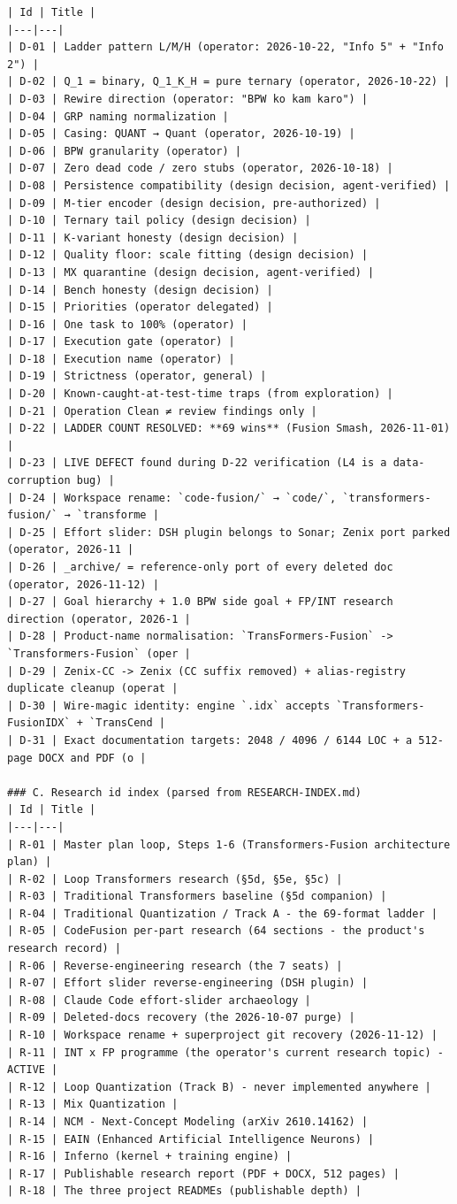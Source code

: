 \begin{Verbatim}[breaklines,breakanywhere,fontsize=\footnotesize]
| Id | Title |
|---|---|
| D-01 | Ladder pattern L/M/H (operator: 2026-10-22, "Info 5" + "Info 2") |
| D-02 | Q_1 = binary, Q_1_K_H = pure ternary (operator, 2026-10-22) |
| D-03 | Rewire direction (operator: "BPW ko kam karo") |
| D-04 | GRP naming normalization |
| D-05 | Casing: QUANT → Quant (operator, 2026-10-19) |
| D-06 | BPW granularity (operator) |
| D-07 | Zero dead code / zero stubs (operator, 2026-10-18) |
| D-08 | Persistence compatibility (design decision, agent-verified) |
| D-09 | M-tier encoder (design decision, pre-authorized) |
| D-10 | Ternary tail policy (design decision) |
| D-11 | K-variant honesty (design decision) |
| D-12 | Quality floor: scale fitting (design decision) |
| D-13 | MX quarantine (design decision, agent-verified) |
| D-14 | Bench honesty (design decision) |
| D-15 | Priorities (operator delegated) |
| D-16 | One task to 100% (operator) |
| D-17 | Execution gate (operator) |
| D-18 | Execution name (operator) |
| D-19 | Strictness (operator, general) |
| D-20 | Known-caught-at-test-time traps (from exploration) |
| D-21 | Operation Clean ≠ review findings only |
| D-22 | LADDER COUNT RESOLVED: **69 wins** (Fusion Smash, 2026-11-01) |
| D-23 | LIVE DEFECT found during D-22 verification (L4 is a data-corruption bug) |
| D-24 | Workspace rename: `code-fusion/` → `code/`, `transformers-fusion/` → `transforme |
| D-25 | Effort slider: DSH plugin belongs to Sonar; Zenix port parked (operator, 2026-11 |
| D-26 | _archive/ = reference-only port of every deleted doc (operator, 2026-11-12) |
| D-27 | Goal hierarchy + 1.0 BPW side goal + FP/INT research direction (operator, 2026-1 |
| D-28 | Product-name normalisation: `TransFormers-Fusion` -> `Transformers-Fusion` (oper |
| D-29 | Zenix-CC -> Zenix (CC suffix removed) + alias-registry duplicate cleanup (operat |
| D-30 | Wire-magic identity: engine `.idx` accepts `Transformers-FusionIDX` + `TransCend |
| D-31 | Exact documentation targets: 2048 / 4096 / 6144 LOC + a 512-page DOCX and PDF (o |

### C. Research id index (parsed from RESEARCH-INDEX.md)
| Id | Title |
|---|---|
| R-01 | Master plan loop, Steps 1-6 (Transformers-Fusion architecture plan) |
| R-02 | Loop Transformers research (§5d, §5e, §5c) |
| R-03 | Traditional Transformers baseline (§5d companion) |
| R-04 | Traditional Quantization / Track A - the 69-format ladder |
| R-05 | CodeFusion per-part research (64 sections - the product's research record) |
| R-06 | Reverse-engineering research (the 7 seats) |
| R-07 | Effort slider reverse-engineering (DSH plugin) |
| R-08 | Claude Code effort-slider archaeology |
| R-09 | Deleted-docs recovery (the 2026-10-07 purge) |
| R-10 | Workspace rename + superproject git recovery (2026-11-12) |
| R-11 | INT x FP programme (the operator's current research topic) - ACTIVE |
| R-12 | Loop Quantization (Track B) - never implemented anywhere |
| R-13 | Mix Quantization |
| R-14 | NCM - Next-Concept Modeling (arXiv 2610.14162) |
| R-15 | EAIN (Enhanced Artificial Intelligence Neurons) |
| R-16 | Inferno (kernel + training engine) |
| R-17 | Publishable research report (PDF + DOCX, 512 pages) |
| R-18 | The three project READMEs (publishable depth) |


\end{Verbatim}
